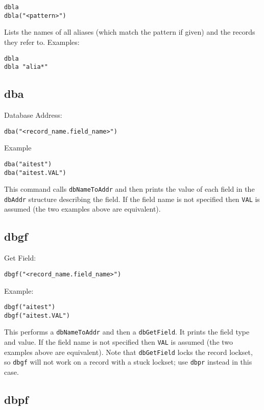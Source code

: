\begin{verbatim}
dbla
dbla("<pattern>")
\end{verbatim}

Lists the names of all aliases (which match the pattern if given) and the records they refer to. Examples:

\begin{verbatim}
dbla
dbla "alia*"
\end{verbatim}

\subsection{dba}

Database Address:

\begin{verbatim}
dba("<record_name.field_name>")
\end{verbatim}

Example

\begin{verbatim}
dba("aitest")
dba("aitest.VAL")
\end{verbatim}

This command calls \verb|dbNameToAddr| and then prints the value of each field in the \verb|dbAddr| structure describing the field. 
If the field name is not specified then \verb|VAL| is assumed (the two examples above are equivalent).

\subsection{dbgf}

Get Field:

\begin{verbatim}
dbgf("<record_name.field_name>")
\end{verbatim}

Example:

\begin{verbatim}
dbgf("aitest")
dbgf("aitest.VAL")
\end{verbatim}

This performs a \verb|dbNameToAddr| and then a \verb|dbGetField|. It prints the field type and value. If the field name is not 
specified then \verb|VAL| is assumed (the two examples above are equivalent). Note that \verb|dbGetField| locks the record lockset, 
so \verb|dbgf| will not work on a record with a stuck lockset; use \verb|dbpr| instead in this case.

\subsection{dbpf}

